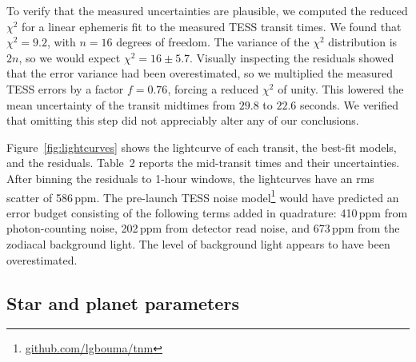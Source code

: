 \documentclass[12pt,twocolumn,tighten]{aastex62}
\begin{document}
To verify that the measured uncertainties are plausible, we computed
the reduced $\chi^2$ for a linear ephemeris fit to the measured TESS
transit times.  We found that $\chi^2 = 9.2$, with $n=16$ degrees of
freedom.  The variance of the $\chi^2$ distribution is $2n$, so we
would expect $\chi^2 = 16 \pm 5.7$.  Visually inspecting the residuals
showed that the error variance had been overestimated, so we
multiplied the measured TESS errors by a factor $f=0.76$, forcing a
reduced $\chi^2$ of unity.  This lowered the mean uncertainty of the
transit midtimes from $29.8$ to $22.6$ seconds.  We verified that
omitting this step did not appreciably alter any of our conclusions.

Figure~\ref{fig:lightcurves} shows the lightcurve of each transit, the
best-fit models, and the residuals.  Table~2 reports the mid-transit
times and their uncertainties.  After binning the residuals to 1-hour
windows, the lightcurves have an rms scatter of 586\,{\rm ppm}.  The
pre-launch TESS noise model\footnote{\url{github.com/lgbouma/tnm}} \citep{winn_photonflux_2013,Sullivan_2015}
would have predicted an error
budget consisting of the following terms added in quadrature:
410\,{\rm ppm} from photon-counting noise, 202\,{\rm ppm} from
detector read noise, and 673\,{\rm ppm} from the zodiacal background
light.  The level of background light appears to have been
overestimated.

\subsection{Star and planet parameters}
\label{sec:system_parameters}
\end{document}
